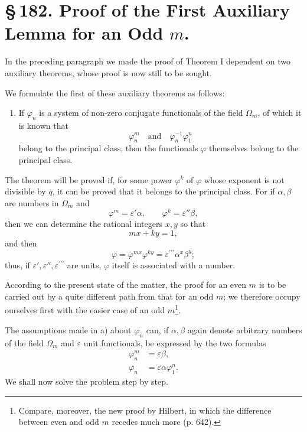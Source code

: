 \documentclass[11pt]{article}
\begin{document}
\clearpage
\section*{\S\,182. Proof of the First Auxiliary Lemma for an Odd $m$.}

In the preceding paragraph we made the proof of Theorem I dependent on two auxiliary theorems, whose proof is now still to be sought.

We formulate the first of these auxiliary theorems as follows:

\begin{enumerate}[label=\alph*),leftmargin=2.2em]
\item If $\varphi_n$ is a system of non-zero conjugate functionals of the field $\Omega_m$, of which it is known that
\[
\varphi_n^m\quad\text{and}\quad\varphi_n^{-1}\varphi_1^n
\]
belong to the principal class, then the functionals $\varphi$ themselves belong to the principal class.
\end{enumerate}

The theorem will be proved if, for some power $\varphi^k$ of $\varphi$ whose exponent is not divisible by $q$, it can be proved that it belongs to the principal class. For if $\alpha,\beta$ are numbers in $\Omega_m$ and
\[
\varphi^m=\varepsilon'\alpha,
\qquad
\varphi^k=\varepsilon''\beta,
\]
then we can determine the rational integers $x,y$ so that
\[
mx+ky=1,
\]
and then
\[
\varphi=\varphi^{mx}\varphi^{ky}=\varepsilon^{\prime\prime\prime}\alpha^x\beta^y;
\]
thus, if $\varepsilon',\varepsilon'',\varepsilon^{\prime\prime\prime}$ are units, $\varphi$ itself is associated with a number.

According to the present state of the matter, the proof for an even $m$ is to be carried out by a quite different path from that for an odd $m$; we therefore occupy ourselves first with the easier case of an odd $m$\footnote{Compare, moreover, the new proof by Hilbert, in which the difference between even and odd $m$ recedes much more (p. 642).}.

The assumptions made in a) about $\varphi_n$ can, if $\alpha,\beta$ again denote arbitrary numbers of the field $\Omega_m$ and $\varepsilon$ unit functionals, be expressed by the two formulas
\begin{align}
\varphi_n^m&=\varepsilon\beta, \tag{1}\\
\varphi_n&=\varepsilon\alpha\varphi_1^n. \tag{2}
\end{align}
We shall now solve the problem step by step.
\end{document}
